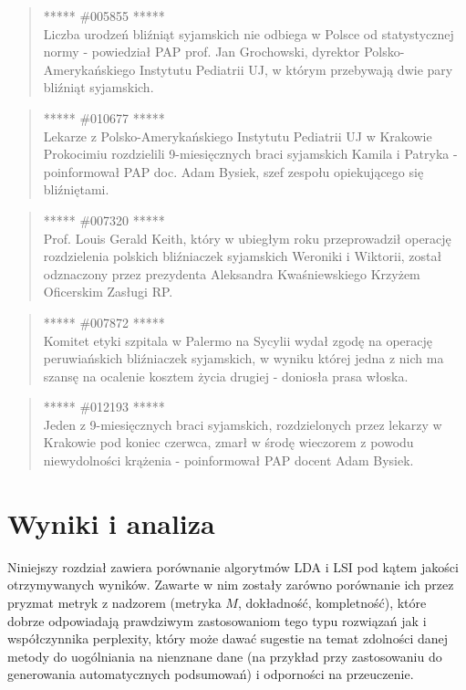 \documentclass[11pt,a4paper]{article}
\begin{document}
\begin{quote} ***** \#005855 *****\\ Liczba urodzeń bliźniąt syjamskich nie
odbiega w Polsce od statystycznej normy - powiedział PAP prof. Jan Grochowski,
dyrektor Polsko-Amerykańskiego Instytutu Pediatrii UJ, w którym przebywają dwie
pary bliźniąt syjamskich.  \end{quote}

\begin{quote} ***** \#010677 *****\\ Lekarze z Polsko-Amerykańskiego Instytutu
Pediatrii UJ w Krakowie Prokocimiu rozdzielili 9-miesięcznych braci syjamskich
Kamila i Patryka - poinformował PAP doc. Adam Bysiek, szef zespołu opiekującego
się bliźniętami.  \end{quote}

\begin{quote} ***** \#007320 *****\\ Prof. Louis Gerald Keith, który w ubiegłym
roku przeprowadził operację rozdzielenia polskich bliźniaczek syjamskich
Weroniki i Wiktorii, został odznaczony przez prezydenta Aleksandra
Kwaśniewskiego Krzyżem Oficerskim Zasługi RP.  \end{quote}

\begin{quote} ***** \#007872 *****\\ Komitet etyki szpitala w Palermo na Sycylii
wydał zgodę na operację peruwiańskich bliźniaczek syjamskich, w wyniku której
jedna z nich ma szansę na ocalenie kosztem życia drugiej - doniosła prasa
włoska.  \end{quote}

\begin{quote} ***** \#012193 *****\\ Jeden z 9-miesięcznych braci syjamskich,
rozdzielonych przez lekarzy w Krakowie pod koniec czerwca, zmarł w środę
wieczorem z powodu niewydolności krążenia - poinformował PAP docent Adam
Bysiek.  \end{quote}

\section{Wyniki i analiza}

Niniejszy rozdział zawiera porównanie algorytmów LDA i LSI pod kątem jakości
otrzymywanych wyników. Zawarte w nim zostały zarówno porównanie ich przez
pryzmat metryk z nadzorem (metryka $M$, dokładność, kompletność), które dobrze
odpowiadają prawdziwym zastosowaniom tego typu rozwiązań jak i współczynnika
perplexity, który może dawać sugestie na temat zdolności danej metody do
uogólniania na nienznane dane (na przykład przy zastosowaniu do generowania
automatycznych podsumowań) i odporności na przeuczenie.
\end{document}
